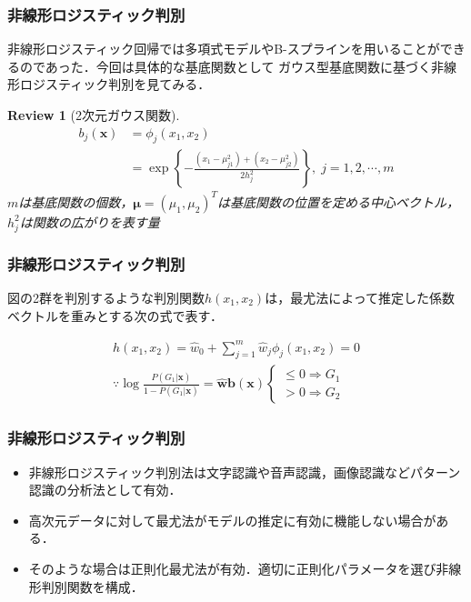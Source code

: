 \documentclass[dvipdfmx,cjk]{beamer}
\theoremstyle{example}
\newtheorem{review}[thm]{Review}
\begin{document}
\begin{frame}
    \frametitle{非線形ロジスティック判別}
    非線形ロジスティック回帰では多項式モデルやB-スプラインを用いることができるのであった．今回は具体的な基底関数として
    ガウス型基底関数に基づく非線形ロジスティック判別を見てみる．
    \begin{review}[2次元ガウス関数]
        \begin{align*}
            b_j(\boldsymbol{x}) & =\phi_j(x_1,x_2)                                                                          \\
                                & =\exp\left\{-\frac{(x_1-\mu_{j1}^2)+(x_2-\mu_{j2}^2)}{2h_j^2}\right\}, \; j=1,2,\cdots ,m
        \end{align*}
        $m$は基底関数の個数，$\boldsymbol{\mu}=(\mu_1,\mu_2)^T$は基底関数の位置を定める中心ベクトル，$h_j^2$は関数の広がりを表す量
    \end{review}
\end{frame}
\begin{frame}
    \frametitle{非線形ロジスティック判別}
    図の2群を判別するような判別関数$h(x_1,x_2)$は，最尤法によって推定した係数ベクトルを重みとする次の式で表す．

    \begin{align*}
        h(x_1,x_2)=\hat{w}_0+\sum_{j=1}^{m}\hat{w}_j\phi_j(x_1,x_2)=0 \\
        \because \log \frac{P(G_1|\boldsymbol{x})}{1-P(G_1|\boldsymbol{x})}=\hat{\boldsymbol{w}}\boldsymbol{b}(\boldsymbol{x})
        \begin{cases}
            \leq 0 \Rightarrow G_1 \\
            > 0 \Rightarrow G_2
        \end{cases}
    \end{align*}
\end{frame}

\begin{frame}
    \frametitle{非線形ロジスティック判別}
    \begin{itemize}
        \item 非線形ロジスティック判別法は文字認識や音声認識，画像認識などパターン認識の分析法として有効．
        \item 高次元データに対して最尤法がモデルの推定に有効に機能しない場合がある．
        \item そのような場合は正則化最尤法が有効．適切に正則化パラメータを選び非線形判別関数を構成．
    \end{itemize}
\end{frame}
\end{document}
